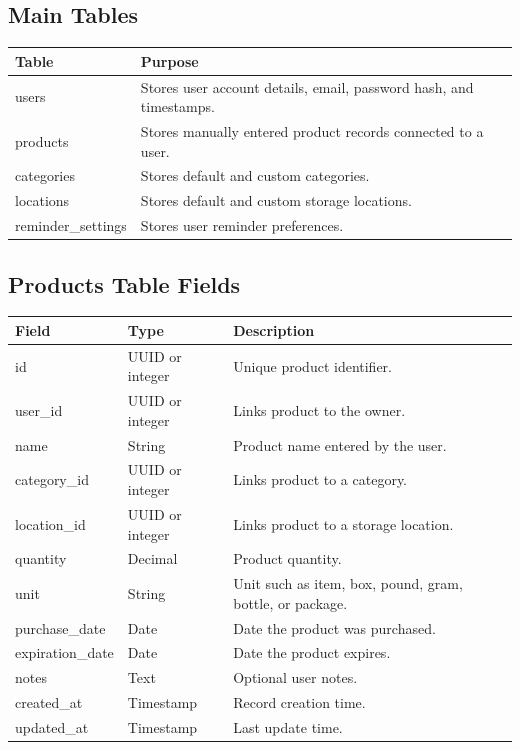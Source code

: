 \documentclass[12pt]{article}
\begin{document}
\subsection{Main Tables}
\begin{longtable}{|p{}|p{}|}
\hline
\textbf{Table} & \textbf{Purpose} \\
\hline
users & Stores user account details, email, password hash, and timestamps. \\
\hline
products & Stores manually entered product records connected to a user. \\
\hline
categories & Stores default and custom categories. \\
\hline
locations & Stores default and custom storage locations. \\
\hline
reminder\_settings & Stores user reminder preferences. \\
\hline
\end{longtable}

\subsection{Products Table Fields}
\begin{longtable}{|p{}|p{}|p{}|}
\hline
\textbf{Field} & \textbf{Type} & \textbf{Description} \\
\hline
id & UUID or integer & Unique product identifier. \\
\hline
user\_id & UUID or integer & Links product to the owner. \\
\hline
name & String & Product name entered by the user. \\
\hline
category\_id & UUID or integer & Links product to a category. \\
\hline
location\_id & UUID or integer & Links product to a storage location. \\
\hline
quantity & Decimal & Product quantity. \\
\hline
unit & String & Unit such as item, box, pound, gram, bottle, or package. \\
\hline
purchase\_date & Date & Date the product was purchased. \\
\hline
expiration\_date & Date & Date the product expires. \\
\hline
notes & Text & Optional user notes. \\
\hline
created\_at & Timestamp & Record creation time. \\
\hline
updated\_at & Timestamp & Last update time. \\
\hline
\end{longtable}
\end{document}
